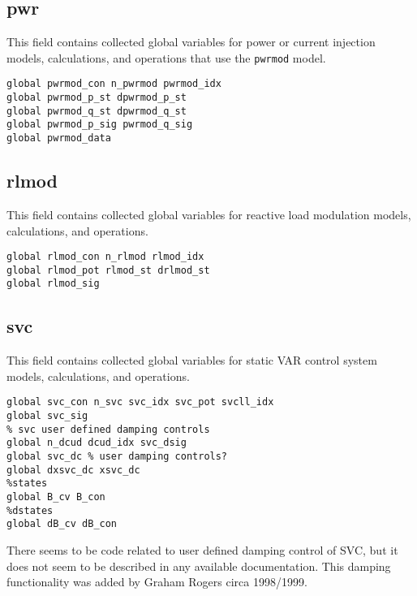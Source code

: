 \subsection{pwr}
This field contains collected global variables for power or current injection models, calculations, and operations that use the \verb|pwrmod| model.
\begin{verbatim}
global pwrmod_con n_pwrmod pwrmod_idx
global pwrmod_p_st dpwrmod_p_st
global pwrmod_q_st dpwrmod_q_st
global pwrmod_p_sig pwrmod_q_sig
global pwrmod_data
\end{verbatim}


\subsection{rlmod}
This field contains collected global variables for reactive load modulation models, calculations, and operations.
\begin{verbatim}
global rlmod_con n_rlmod rlmod_idx
global rlmod_pot rlmod_st drlmod_st
global rlmod_sig
\end{verbatim}

\subsection{svc}
This field contains collected global variables for static VAR control system models, calculations, and operations.
\begin{verbatim}
global svc_con n_svc svc_idx svc_pot svcll_idx
global svc_sig
% svc user defined damping controls
global n_dcud dcud_idx svc_dsig
global svc_dc % user damping controls?
global dxsvc_dc xsvc_dc
%states
global B_cv B_con
%dstates
global dB_cv dB_con
\end{verbatim}

There seems to be code related to user defined damping control of SVC, but it does not seem to be described in any available documentation. 
This damping functionality was added by Graham Rogers circa 1998/1999.


